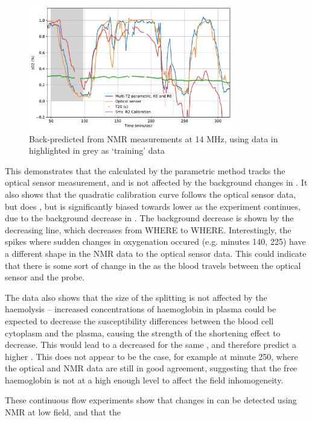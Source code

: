 \begin{figure}[t]
\centering
\includegraphics[width=0.8\textwidth]{figures/contflow/calibratedNMRSO2.pdf}
\caption[Back-predicted \SOtwo from NMR measurements at 14 MHz]{Back-predicted \SOtwo from NMR measurements at 14 MHz, using data in highlighted in grey as `training' data}
\label{fig:contflow-NMRSO2}
\end{figure}

This demonstrates that the \SOtwo calculated by the parametric method tracks the optical sensor measurement, and is not affected by the background changes in \Ttwo.
It also shows that the quadratic calibration curve follows the optical sensor data, but does
, but is significantly biased towards lower \SOtwo as the experiment continues, due to the background decrease in \Ttwo.
The background decrease is shown by the decreasing \TtwoO line, which decreases from WHERE to WHERE.
Interestingly, the spikes where sudden changes in oxygenation occured (e.g. minutes 140, 225) have a different shape in the NMR data to the optical sensor data.
This could indicate that there is some sort of change in the \SOtwo as the blood travels between the optical sensor and the probe.

The data also shows that the size of the splitting is not affected by the haemolysis -- increased concentrations of haemoglobin in plasma could be expected to decrease the susceptibility differences between the blood cell cytoplasm and the plasma, causing the strength of the \Ttwo shortening effect to decrease.
This would lead to a decreased \Kzero for the same \SOtwo, and therefore predict a higher \SOtwo.
This does not appear to be the case, for example at minute 250, where the optical and NMR data are still in good agreement, suggesting that the free haemoglobin is not at a high enough level to affect the field inhomogeneity.

These continuous flow experiments show that changes in \SOtwo can be detected using NMR at low field, and that the
